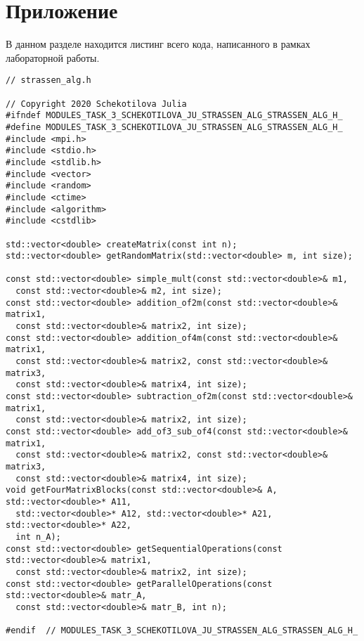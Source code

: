 \documentclass{report}
\begin{document}
\section*{Приложение}
В данном разделе находится листинг всего кода, написанного в рамках лабораторной работы.
\begin{lstlisting}
// strassen_alg.h

// Copyright 2020 Schekotilova Julia
#ifndef MODULES_TASK_3_SCHEKOTILOVA_JU_STRASSEN_ALG_STRASSEN_ALG_H_
#define MODULES_TASK_3_SCHEKOTILOVA_JU_STRASSEN_ALG_STRASSEN_ALG_H_
#include <mpi.h>
#include <stdio.h>
#include <stdlib.h>
#include <vector>
#include <random>
#include <ctime>
#include <algorithm>
#include <cstdlib>

std::vector<double> createMatrix(const int n);
std::vector<double> getRandomMatrix(std::vector<double> m, int size);

const std::vector<double> simple_mult(const std::vector<double>& m1,
  const std::vector<double>& m2, int size);
const std::vector<double> addition_of2m(const std::vector<double>& matrix1,
  const std::vector<double>& matrix2, int size);
const std::vector<double> addition_of4m(const std::vector<double>& matrix1,
  const std::vector<double>& matrix2, const std::vector<double>& matrix3,
  const std::vector<double>& matrix4, int size);
const std::vector<double> subtraction_of2m(const std::vector<double>& matrix1,
  const std::vector<double>& matrix2, int size);
const std::vector<double> add_of3_sub_of4(const std::vector<double>& matrix1,
  const std::vector<double>& matrix2, const std::vector<double>& matrix3,
  const std::vector<double>& matrix4, int size);
void getFourMatrixBlocks(const std::vector<double>& A, std::vector<double>* A11,
  std::vector<double>* A12, std::vector<double>* A21, std::vector<double>* A22,
  int n_A);
const std::vector<double> getSequentialOperations(const std::vector<double>& matrix1,
  const std::vector<double>& matrix2, int size);
const std::vector<double> getParallelOperations(const std::vector<double>& matr_A,
  const std::vector<double>& matr_B, int n);

#endif  // MODULES_TASK_3_SCHEKOTILOVA_JU_STRASSEN_ALG_STRASSEN_ALG_H_
\end{lstlisting}
\end{document}
